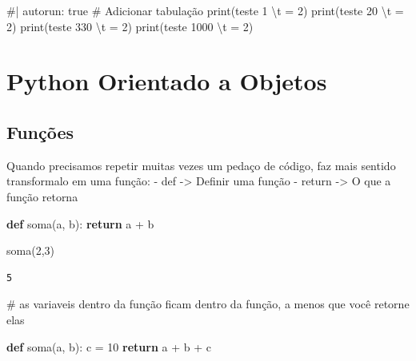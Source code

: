 \documentclass[
  letterpaper,
  DIV=11,
  numbers=noendperiod]{scrreprt}
\newenvironment{Shaded}{\begin{snugshade}}{\end{snugshade}}
\newcommand{\CommentTok}[1]{\textcolor[rgb]{0.37,0.37,0.37}{#1}}
\newcommand{\ControlFlowTok}[1]{\textcolor[rgb]{0.00,0.23,0.31}{\textbf{#1}}}
\newcommand{\DecValTok}[1]{\textcolor[rgb]{0.68,0.00,0.00}{#1}}
\newcommand{\KeywordTok}[1]{\textcolor[rgb]{0.00,0.23,0.31}{\textbf{#1}}}
\newcommand{\NormalTok}[1]{\textcolor[rgb]{0.00,0.23,0.31}{#1}}
\newcommand{\OperatorTok}[1]{\textcolor[rgb]{0.37,0.37,0.37}{#1}}
\begin{document}
\begin{Shaded}
\begin{Highlighting}[]
\NormalTok{\#| autorun: true}
\NormalTok{\# Adicionar tabulação}
\NormalTok{print(\textquotesingle{}teste 1 \textbackslash{}t = 2\textquotesingle{})}
\NormalTok{print(\textquotesingle{}teste 20 \textbackslash{}t = 2\textquotesingle{})}
\NormalTok{print(\textquotesingle{}teste 330 \textbackslash{}t = 2\textquotesingle{})}
\NormalTok{print(\textquotesingle{}teste 1000 \textbackslash{}t = 2\textquotesingle{})}
\end{Highlighting}
\end{Shaded}

\chapter{Python Orientado a Objetos}\label{python-orientado-a-objetos}

\section{Funções}\label{funuxe7uxf5es}

Quando precisamos repetir muitas vezes um pedaço de código, faz mais
sentido transformalo em uma função: - def -\textgreater{} Definir uma
função - return -\textgreater{} O que a função retorna

\begin{Shaded}
\begin{Highlighting}[]
\KeywordTok{def}\NormalTok{ soma(a, b):}
    \ControlFlowTok{return}\NormalTok{ a }\OperatorTok{+}\NormalTok{ b}
\end{Highlighting}
\end{Shaded}

\begin{Shaded}
\begin{Highlighting}[]
\NormalTok{soma(}\DecValTok{2}\NormalTok{,}\DecValTok{3}\NormalTok{)}
\end{Highlighting}
\end{Shaded}

\begin{verbatim}
5
\end{verbatim}

\begin{Shaded}
\begin{Highlighting}[]
\CommentTok{\# as variaveis dentro da função ficam dentro da função, a menos que você retorne elas}

\KeywordTok{def}\NormalTok{ soma(a, b):}
\NormalTok{    c }\OperatorTok{=} \DecValTok{10}
    \ControlFlowTok{return}\NormalTok{ a }\OperatorTok{+}\NormalTok{ b }\OperatorTok{+}\NormalTok{ c}
\end{Highlighting}
\end{Shaded}
\end{document}
